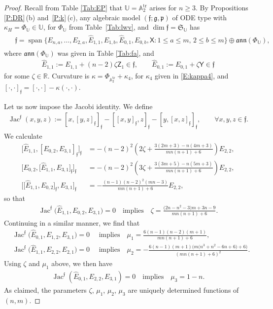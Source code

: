 \documentclass[pdftex]{sigma}%
\DeclareMathOperator{\tr}{tr}
\DeclareMathOperator{\sn}{span}
\newcommand\Jac{\operatorname{Jac}}
\newcommand{\g}{\mathfrak{g}}
\newcommand\fann{\mathfrak{ann}}
\newcommand\ff{\mathfrak{f}}
\newcommand\fp{\mathfrak{p}}
\newcommand\fS{\mathfrak{S}}
\newcommand{\R}{\mathbb{R}}
\newcommand\bbU{\mathbb{U}}
\newcommand\bbA{\mathbb{A}}
\newcommand\sfX{\mathsf{X}}
\newcommand\sfY{\mathsf{Y}}
\newcommand\sfZ{\mathsf{Z}}
\numberwithin{equation}{section}
\begin{document}
\begin{proof}
Recall from Table \ref{Tab:EP} that $\bbU = \bbA_2^{\tr}$ arises for $n \ge 3$. By Propositions \ref{P:DR}\,(b) and~\ref{P:k}\,(c), any algebraic model $(\ff;\g, \fp)$ of ODE type with $\kappa_H = \Phi_\bbU \in \bbU$, for $\Phi_\bbU$ from Table~\ref{Tab:lwv}, and $\dim \ff = \fS_\bbU$ has
\begin{align}\label{E:fA2}
\begin{split}
&\ff = \sn\bigl\{E_{n,a},\dots, E_{2,a},\widehat{E}_{1,1},E_{1,b}, \widehat{E}_{0,1},E_{0,b}, \sfX \colon 1\le a \le m,\, 2 \le b \le m \bigr\} \oplus \fann (\Phi_\bbU),
\end{split}
\end{align}
 where $\fann (\Phi_\bbU)$ was given in Table \ref{Tab:fa}, and
\begin{align*}
\widehat{E}_{1,1} := E_{1,1} + (n-2)\zeta \sfZ_1 \in \ff, \qquad \widehat{E}_{0,1} := E_{0,1} + \zeta \sfY \in \ff
\end{align*}
 for some $\zeta \in \R$. Curvature is $\kappa =\Phi_{\bbA_2^{\tr}} + \kappa_4$, for $\kappa_4$ given in \eqref{E:kappa4}, and $[\cdot,\cdot]_\ff = [\cdot, \cdot] - \kappa(\cdot,\cdot)$.

Let us now impose the Jacobi identity. We define
\begin{align*} %
\Jac^\ff(x,y,z) := [x,[y,z]_{\ff}]_{\ff} -[[x,y]_{\ff}, z]_{\ff} -[y, [x, z]_{\ff}]_{\ff}, \qquad \forall x,y,z \in \ff.
\end{align*}
We calculate
\begin{align*}%
\big[\widehat{E}_{1,1},[E_{0,2},E_{3,1}]_\ff\big]_\ff &= -(n-2)^2\left( 2\zeta +\frac{3(2m+3)-n(4m+3)}{mn(n+1)+6} \right)E_{2,2},\\
\big[E_{0,2},\big[\widehat{E}_{1,1},E_{3,1}\big]_\ff\big]_\ff &= -(n-2)^2\left(3\zeta +\frac{3(3m+5)-n(5m+3)}{mn(n+1)+6} \right)E_{2,2}, \\
\big[\big[\widehat{E}_{1,1},E_{0,2}\big]_\ff,E_{3,1}\big]_\ff &= -\frac{(n-1)(n-2)^2(mn-3)}{mn(n+1)+6}E_{2,2},
\end{align*}
so that
\begin{align}\label{E:zeta}
\Jac^\ff\bigl(\widehat{E}_{1,1}, E_{0,2},E_{3,1}\bigr) = 0 \quad \text{implies}\quad \zeta= \frac{\bigl(2n-n^2-3\bigr)m + 3n-9}{mn(n+1)+6}.
\end{align}
 Continuing in a similar manner, we find that
\begin{align}
& \Jac^\ff\bigl(\widehat{E}_{0,1}, E_{1,2},E_{3,1}\bigr) = 0 \quad \text{ implies}\quad \mu_1 = \frac{6(n-1)(n-2)(m+1)}{mn(n+1)+6},\label{E:mu}\\
& \Jac^\ff\bigl(\widehat{E}_{1,1}, E_{2,2},E_{2,1}\bigr) = 0 \quad \text{ implies}\quad \mu_2 = -\frac{6(n-1)(m+1)\bigl(m\bigl(n^3 + n^2-6n + 6\bigr) + 6\bigr)}{(mn(n+1)+6)^2}.\nonumber
\end{align}
Using $\zeta$ and $\mu_1$ above, we then have
\begin{align}\label{E:mu3}
\Jac^\ff(\widehat{E}_{0,1}, E_{2,2},E_{3,1}) = 0 \quad \text{implies} \quad \mu_3= 1-n.
\end{align}
As claimed, the parameters $\zeta$, $\mu_1$, $\mu_2$, $\mu_3$ are uniquely determined functions of $(n,m)$.


\end{proof}
\end{document}

